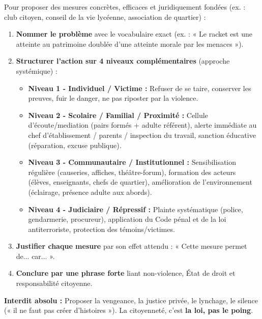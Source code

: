 \documentclass[11pt]{article}
\begin{document}
\begin{methode}
Pour proposer des mesures concrètes, efficaces et juridiquement fondées (ex. : club citoyen, conseil de la vie lycéenne, association de quartier) :
\begin{enumerate}
\item \textbf{Nommer le problème} avec le vocabulaire exact (ex. : « Le racket est une atteinte au patrimoine doublée d'une atteinte morale par les menaces »).
\item \textbf{Structurer l'action sur 4 niveaux complémentaires} (approche systémique) :
\begin{itemize}
\item \textbf{Niveau 1 - Individuel / Victime :} Refuser de se taire, conserver les preuves, fuir le danger, ne pas riposter par la violence.
\item \textbf{Niveau 2 - Scolaire / Familial / Proximité :} Cellule d'écoute/mediation (pairs formés + adulte référent), alerte immédiate au chef d'établissement / parents / inspection du travail, sanction éducative (réparation, excuse publique).
\item \textbf{Niveau 3 - Communautaire / Institutionnel :} Sensibilisation régulière (causeries, affiches, théâtre-forum), formation des acteurs (élèves, enseignants, chefs de quartier), amélioration de l'environnement (éclairage, présence adulte aux abords).
\item \textbf{Niveau 4 - Judiciaire / Répressif :} Plainte systématique (police, gendarmerie, procureur), application du Code pénal et de la loi antiterroriste, protection des témoins/victimes.
\end{itemize}
\item \textbf{Justifier chaque mesure} par son effet attendu : « Cette mesure permet de... car... ».
\item \textbf{Conclure par une phrase forte} liant non-violence, État de droit et responsabilité citoyenne.
\end{enumerate}
\textbf{Interdit absolu :} Proposer la vengeance, la justice privée, le lynchage, le silence (« il ne faut pas créer d'histoires »). La citoyenneté, c'est \textbf{la loi, pas le poing}.
\end{methode}
\end{document}

